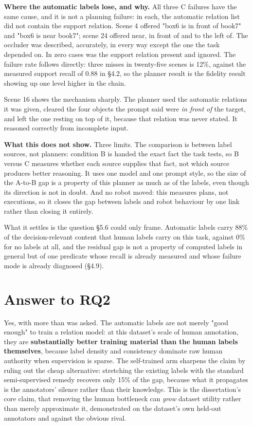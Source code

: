 \textbf{Where the automatic labels lose, and why.} All three C failures have the same cause, and it is not a planning failure: in each, the automatic relation list did not contain the support relation. Scene 4 offered "box6 is in front of book7" and "box6 is near book7"; scene 24 offered near, in front of and to the left of. The occluder was described, accurately, in every way except the one the task depended on. In zero cases was the support relation present and ignored. The failure rate follows directly: three misses in twenty-five scenes is 12\%, against the measured support recall of 0.88 in \S4.2, so the planner result is the fidelity result showing up one level higher in the chain.

Scene 16 shows the mechanism sharply. The planner used the automatic relations it was given, cleared the four objects the prompt said were \textit{in front of} the target, and left the one resting on top of it, because that relation was never stated. It reasoned correctly from incomplete input.

\textbf{What this does not show.} Three limits. The comparison is between label sources, not planners: condition B is handed the exact fact the task tests, so B versus C measures whether each source supplies that fact, not which source produces better reasoning. It uses one model and one prompt style, so the size of the A-to-B gap is a property of this planner as much as of the labels, even though its direction is not in doubt. And no robot moved: this measures plans, not executions, so it closes the gap between labels and robot behaviour by one link rather than closing it entirely.

What it settles is the question \S5.6 could only frame. Automatic labels carry 88\% of the decision-relevant content that human labels carry on this task, against 0\% for no labels at all, and the residual gap is not a property of computed labels in general but of one predicate whose recall is already measured and whose failure mode is already diagnosed (\S4.9).

\section{Answer to RQ2}

Yes, with more than was asked. The automatic labels are not merely "good enough" to train a relation model: at this dataset's scale of human annotation, they are \textbf{substantially better training material than the human labels themselves}, because label density and consistency dominate raw human authority when supervision is sparse. The self-trained arm sharpens the claim by ruling out the cheap alternative: stretching the existing labels with the standard semi-supervised remedy recovers only 15\% of the gap, because what it propagates is the annotators' silence rather than their knowledge. This is the dissertation's core claim, that removing the human bottleneck can \textit{grow} dataset utility rather than merely approximate it, demonstrated on the dataset's own held-out annotators and against the obvious rival.